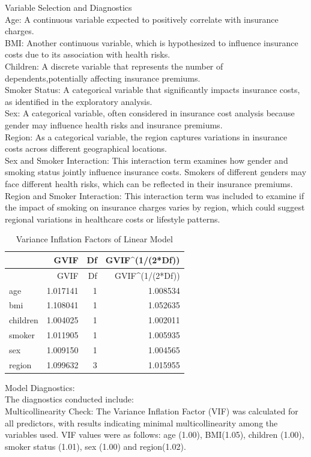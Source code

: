 \documentclass[
  12pt,
]{article}
\begin{document}
Variable Selection and Diagnostics\\
Age: A continuous variable expected to positively correlate with
insurance charges.\\
BMI: Another continuous variable, which is hypothesized to influence
insurance costs due to its association with health risks.\\
Children: A discrete variable that represents the number of
dependents,potentially affecting insurance premiums.\\
Smoker Status: A categorical variable that significantly impacts
insurance costs, as identified in the exploratory analysis.\\
Sex: A categorical variable, often considered in insurance cost analysis
because gender may influence health risks and insurance premiums.\\
Region: As a categorical variable, the region captures variations in
insurance costs across different geographical locations.\\
Sex and Smoker Interaction: This interaction term examines how gender
and smoking status jointly influence insurance costs. Smokers of
different genders may face different health risks, which can be
reflected in their insurance premiums.\\
Region and Smoker Interaction: This interaction term was included to
examine if the impact of smoking on insurance charges varies by region,
which could suggest regional variations in healthcare costs or lifestyle
patterns.

\begin{longtable}[]{@{}lrrr@{}}
\caption{Variance Inflation Factors of Linear Model}\tabularnewline
\toprule\noalign{}
& GVIF & Df & GVIF\^{}(1/(2*Df)) \\
\midrule\noalign{}
\endfirsthead
\toprule\noalign{}
& GVIF & Df & GVIF\^{}(1/(2*Df)) \\
\midrule\noalign{}
\endhead
\bottomrule\noalign{}
\endlastfoot
age & 1.017141 & 1 & 1.008534 \\
bmi & 1.108041 & 1 & 1.052635 \\
children & 1.004025 & 1 & 1.002011 \\
smoker & 1.011905 & 1 & 1.005935 \\
sex & 1.009150 & 1 & 1.004565 \\
region & 1.099632 & 3 & 1.015955 \\
\end{longtable}

Model Diagnostics:\\
The diagnostics conducted include:\\
Multicollinearity Check: The Variance Inflation Factor (VIF) was
calculated for all predictors, with results indicating minimal
multicollinearity among the variables used. VIF values were as follows:
age (1.00), BMI(1.05), children (1.00), smoker status (1.01), sex (1.00)
and region(1.02).
\end{document}
